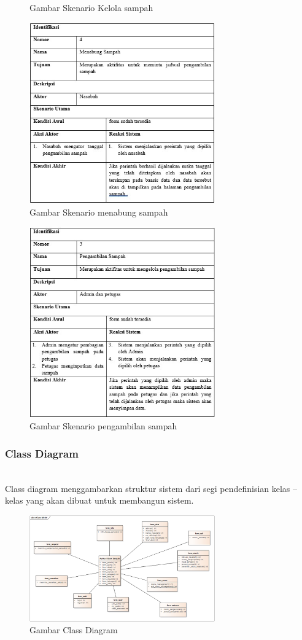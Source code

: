 \begin{enumerate}
\begin{figure}[H]
		\centering
		\caption{Gambar Skenario Kelola sampah}
	\end{figure}	
	\begin{figure}[H]
		\includegraphics[width=8cm]{figures/analisis/a6.jpg}
		\centering
		\caption{Gambar Skenario menabung sampah}
	\end{figure}	
	\begin{figure}[H]
		\includegraphics[width=8cm]{figures/analisis/a7.jpg}
		\centering
		\caption{Gambar Skenario pengambilan sampah}
	\end{figure}	
\end{enumerate}

\subsubsection{Class Diagram}
\hfill\\
Class diagram menggambarkan struktur sistem dari segi pendefinisian kelas – kelas yang akan dibuat untuk membangun sistem.
	\begin{figure}[H]
		\includegraphics[width=8cm]{figures/analisis/5.png}
		\centering
		\caption{Gambar Class Diagram}
	\end{figure}
	
